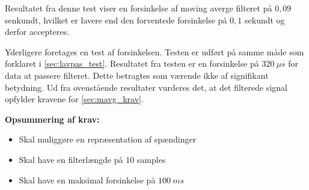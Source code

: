 \noindent
Resultatet fra denne test viser en forsinkelse af moving averge filteret på $0,09$ senkundt, hvilket er lavere end den forventede forsinkelse på $0,1$ sekundt og derfor accepteres. 

Yderligere foretages en test af forsinkelsen. Testen er udført på samme måde som forklaret i \autoref{sec:lavpas_test}. Resultatet fra testen er en forsinkelse på $320~\mu s$ for data at passere filteret. Dette betragtes som værende ikke af signifikant betydning.    
Ud fra ovenstående resultater vurderes det, at det filterede signal opfylder kravene for \autoref{sec:mavg_krav}. 


\vspace{3mm}
\textbf{Opsummering af krav:}
\begin{itemize}
\item[\text{\sffamily \checkmark}] Skal muliggøre en repræsentation af spændinger 
\item[\text{\sffamily \checkmark}] Skal have en filterlængde på $10$ samples
\item[\text{\sffamily \checkmark}] Skal have en maksimal forsinkelse på $100~ms$
\end{itemize}